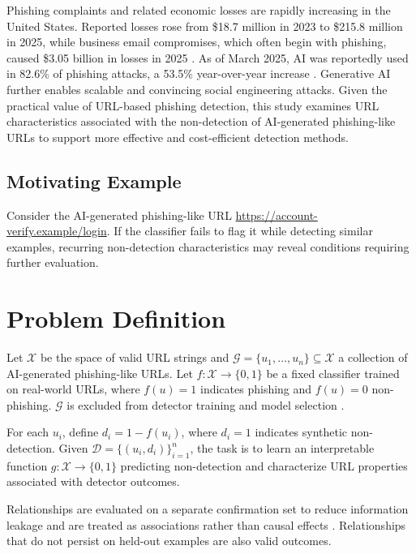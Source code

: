 \documentclass[sigconf]{acmart}
\begin{document}
\begin{bibunit}
Phishing complaints and related economic losses are rapidly increasing in the United States. Reported losses rose from \$18.7 million in 2023 to \$215.8 million in 2025, while business email compromises, which often begin with phishing, caused \$3.05 billion in losses in 2025 \cite{axis2026}. As of March 2025, AI was reportedly used in 82.6\% of phishing attacks, a 53.5\% year-over-year increase \cite{bay2025}. Generative AI further enables scalable and convincing social engineering attacks. Given the practical value of URL-based phishing detection, this study examines URL characteristics associated with the non-detection of AI-generated phishing-like URLs to support more effective and cost-efficient detection methods.

\subsection{Motivating Example}

Consider the AI-generated phishing-like URL
\url{https://account-verify.example/login}. If the classifier fails to flag it while detecting similar examples, recurring non-detection characteristics may reveal conditions requiring further evaluation.

\section{Problem Definition}

Let $\mathcal{X}$ be the space of valid URL strings and
$\mathcal{G}=\{u_1,\ldots,u_n\}\subseteq\mathcal{X}$ a collection of
AI-generated phishing-like URLs. Let $f:\mathcal{X}\rightarrow\{0,1\}$ be a fixed classifier trained on real-world URLs, where $f(u)=1$ indicates phishing and $f(u)=0$ non-phishing. $\mathcal{G}$ is excluded from detector training and model selection \cite{arp2022dos}.

For each $u_i$, define $d_i=1-f(u_i)$, where $d_i=1$ indicates synthetic non-detection. Given $\mathcal{D}=\{(u_i,d_i)\}_{i=1}^{n}$, the task is to learn an interpretable function $g:\mathcal{X}\rightarrow\{0,1\}$ predicting non-detection and characterize URL properties associated with detector outcomes.

Relationships are evaluated on a separate confirmation set to reduce
information leakage \cite{arp2022dos} and are treated as associations rather than causal effects \cite{dillon_shap_causal}. Relationships that do not persist on held-out examples are also valid outcomes.


\end{bibunit}
\end{document}
